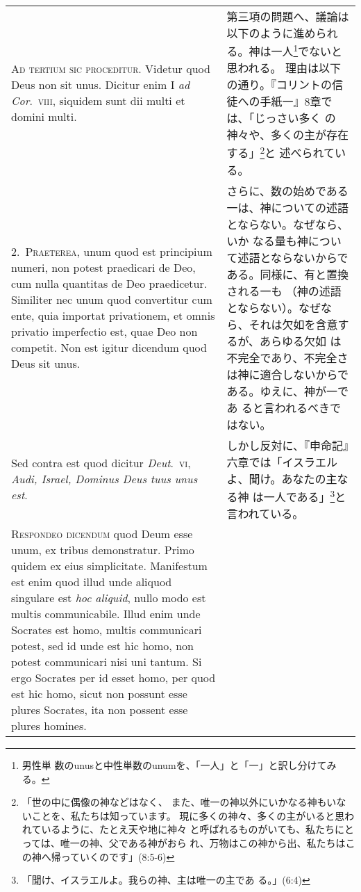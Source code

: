 \documentclass[10pt]{jsarticle} %
\begin{document}
\begin{longtable}{p{21em}p{21em}}
{\huge A}{\scshape d tertium sic proceditur}. Videtur quod Deus non sit
 unus. Dicitur enim I {\it ad Cor}.~{\scshape viii}, siquidem sunt dii multi et domini multi.

&

第三項の問題へ、議論は以下のように進められる。神は一人\footnote{男性単
 数のunusと中性単数のunumを、「一人」と「一」と訳し分けてみる。}でないと思われる。
 理由は以下の通り。『コリントの信徒への手紙一』8章では、「じっさい多く
 の神々や、多くの主が存在する」\footnote{「世の中に偶像の神などはなく、
 また、唯一の神以外にいかなる神もいないことを、私たちは知っています。
 現に多くの神々、多くの主がいると思われているように、たとえ天や地に神々
 と呼ばれるものがいても、私たちにとっては、唯一の神、父である神がおら
 れ、万物はこの神から出、私たちはこの神へ帰っていくのです」(8:5-6)}と
 述べられている。

\\

2.~{\scshape Praeterea}, unum quod est principium numeri, non potest praedicari de
Deo, cum nulla quantitas de Deo praedicetur. Similiter nec unum quod
convertitur cum ente, quia importat privationem, et omnis privatio
imperfectio est, quae Deo non competit. Non est igitur dicendum quod
Deus sit unus.

&

さらに、数の始めである一は、神についての述語とならない。なぜなら、いか
なる量も神について述語とならないからである。同様に、有と置換される一も
（神の述語とならない）。なぜなら、それは欠如を含意するが、あらゆる欠如
は不完全であり、不完全さは神に適合しないからである。ゆえに、神が一であ
ると言われるべきではない。

\\

Sed contra est quod dicitur {\it Deut}.~{\scshape vi}, {\itshape Audi,
 Israel, Dominus Deus tuus unus est}.

&

しかし反対に、『申命記』六章では「イスラエルよ、聞け。あなたの主なる神
は一人である」\footnote{「聞け、イスラエルよ。我らの神、主は唯一の主であ
る。」(6:4)}と言われている。


\\

{\scshape Respondeo dicendum} quod Deum esse unum, ex tribus
demonstratur. Primo quidem ex eius simplicitate. Manifestum est enim
quod illud unde aliquod singulare est {\itshape hoc aliquid}, nullo modo est multis
communicabile. Illud enim unde Socrates est homo, multis communicari
potest, sed id unde est hic homo, non potest communicari nisi uni
tantum. Si ergo Socrates per id esset homo, per quod est hic homo, sicut
non possunt esse plures Socrates, ita non possent esse plures
homines. 


\end{longtable}
\end{document}
